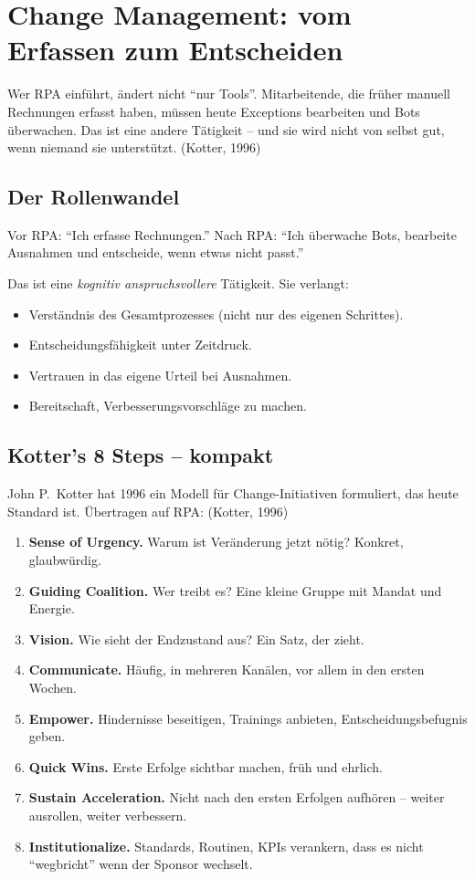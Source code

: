 \documentclass[11pt,a4paper,oneside]{article}
\newcommand{\quelle}[1]{{\footnotesize\color{lpGray}(#1)}}
\begin{document}
\section{Change Management: vom Erfassen zum Entscheiden}

Wer RPA einführt, ändert nicht ``nur Tools''. Mitarbeitende, die früher manuell Rechnungen erfasst haben, müssen heute Exceptions bearbeiten und Bots überwachen. Das ist eine andere Tätigkeit -- und sie wird nicht von selbst gut, wenn niemand sie unterstützt. \quelle{Kotter, 1996}

\subsection{Der Rollenwandel}

Vor RPA: ``Ich erfasse Rechnungen.'' Nach RPA: ``Ich überwache Bots, bearbeite Ausnahmen und entscheide, wenn etwas nicht passt.''

Das ist eine \emph{kognitiv anspruchsvollere} Tätigkeit. Sie verlangt:

\begin{itemize}
  \item Verständnis des Gesamtprozesses (nicht nur des eigenen Schrittes).
  \item Entscheidungsfähigkeit unter Zeitdruck.
  \item Vertrauen in das eigene Urteil bei Ausnahmen.
  \item Bereitschaft, Verbesserungsvorschläge zu machen.
\end{itemize}

\subsection{Kotter's 8 Steps -- kompakt}

John P.\ Kotter hat 1996 ein Modell für Change-Initiativen formuliert, das heute Standard ist. Übertragen auf RPA: \quelle{Kotter, 1996}

\begin{enumerate}
  \item \textbf{Sense of Urgency.} Warum ist Veränderung jetzt nötig? Konkret, glaubwürdig.
  \item \textbf{Guiding Coalition.} Wer treibt es? Eine kleine Gruppe mit Mandat und Energie.
  \item \textbf{Vision.} Wie sieht der Endzustand aus? Ein Satz, der zieht.
  \item \textbf{Communicate.} Häufig, in mehreren Kanälen, vor allem in den ersten Wochen.
  \item \textbf{Empower.} Hindernisse beseitigen, Trainings anbieten, Entscheidungsbefugnis geben.
  \item \textbf{Quick Wins.} Erste Erfolge sichtbar machen, früh und ehrlich.
  \item \textbf{Sustain Acceleration.} Nicht nach den ersten Erfolgen aufhören -- weiter ausrollen, weiter verbessern.
  \item \textbf{Institutionalize.} Standards, Routinen, KPIs verankern, dass es nicht ``wegbricht'' wenn der Sponsor wechselt.
\end{enumerate}
\end{document}
